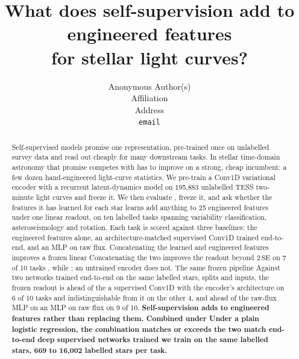 \documentclass{article}
\title{What does self-supervision add to engineered features\\for stellar light curves?}
\author{Anonymous Author(s)\\Affiliation\\Address\\\texttt{email}}
\providecommand{\DIFaddtex}[1]{{\protect\color{blue} \sf #1}} %
\providecommand{\DIFdeltex}[1]{{\protect\color{red} \scriptsize #1}} %
\providecommand{\DIFaddbegin}{} %
\providecommand{\DIFaddend}{} %
\providecommand{\DIFdelbegin}{} %
\providecommand{\DIFdelend}{} %
\providecommand{\DIFadd}[1]{\texorpdfstring{\DIFaddtex{#1}}{#1}} %
\providecommand{\DIFdel}[1]{\texorpdfstring{\DIFdeltex{#1}}{}} %
\providecommand{\DIFscaledelfig}{0.5}
\newlength{\DIFdelgraphicswidth} %
\newlength{\DIFdelgraphicsheight} %
\providecommand{\DIFaddincludegraphics}[2][]{{\color{blue}\fbox{\DIFOincludegraphics[#1]{#2}}}} %
\providecommand{\DIFdelincludegraphics}[2][]{%
\sbox{\DIFdelgraphicsbox}{\DIFOincludegraphics[#1]{#2}}%
\settoboxwidth{\DIFdelgraphicswidth}{\DIFdelgraphicsbox} %
\settoboxtotalheight{\DIFdelgraphicsheight}{\DIFdelgraphicsbox} %
\scalebox{\DIFscaledelfig}{%
\parbox[b]{\DIFdelgraphicswidth}{\usebox{\DIFdelgraphicsbox}\\[-\baselineskip] \rule{\DIFdelgraphicswidth}{0em}}\llap{\resizebox{\DIFdelgraphicswidth}{\DIFdelgraphicsheight}{%
\setlength{\unitlength}{\DIFdelgraphicswidth}%
\begin{picture}(1,1)%
\thicklines\linethickness{2pt} %
{\color[rgb]{1,0,0}\put(0,0){\framebox(1,1){}}}%
{\color[rgb]{1,0,0}\put(0,0){\line( 1,1){1}}}%
{\color[rgb]{1,0,0}\put(0,1){\line(1,-1){1}}}%
\end{picture}%
}\hspace*{3pt}}} %
} %
\DeclareRobustCommand{\DIFaddbegin}{\DIFOaddbegin \let\includegraphics\DIFaddincludegraphics} %
\DeclareRobustCommand{\DIFaddend}{\DIFOaddend \let\includegraphics\DIFOincludegraphics} %
\DeclareRobustCommand{\DIFdelbegin}{\DIFOdelbegin \let\includegraphics\DIFdelincludegraphics} %
\DeclareRobustCommand{\DIFdelend}{\DIFOaddend \let\includegraphics\DIFOincludegraphics} %
\begin{document}
\maketitle

\begin{abstract}
Self-supervised models promise one representation, pre-trained once on unlabelled survey data and
read out cheaply for many downstream tasks. In stellar time-domain astronomy that promise \DIFdelbegin \DIFdel{competes
with }\DIFdelend \DIFaddbegin \DIFadd{has to
improve on }\DIFaddend a strong, cheap incumbent: a few dozen \DIFdelbegin \DIFdel{hand-}\DIFdelend engineered light-curve statistics. We \DIFaddbegin \DIFadd{pre-}\DIFaddend train a
Conv1D variational encoder with a recurrent latent-dynamics model on 195{,}883 unlabelled TESS
two-minute light curves\DIFdelbegin \DIFdel{and freeze it. We then evaluate }\DIFdelend \DIFaddbegin \DIFadd{, freeze it, and ask whether }\DIFaddend the features it \DIFdelbegin \DIFdel{has learned for each star }\DIFdelend \DIFaddbegin \DIFadd{learns add anything to 25
engineered features under one linear readout, }\DIFaddend on ten labelled tasks spanning variability
classification, asteroseismology and rotation. \DIFdelbegin \DIFdel{Each task is
scored against three baselines: the engineered features alone, an architecture-matched supervised
Conv1D trained end-to-end, and an MLP on raw flux. Concatenating the learned and engineered features
improves a frozen linear }\DIFdelend \DIFaddbegin \DIFadd{Concatenating the two improves the }\DIFaddend readout beyond
$2\,\mathrm{SE}$ on 7 of 10 tasks\DIFdelbegin \DIFdel{, while }\DIFdelend \DIFaddbegin \DIFadd{; }\DIFaddend an untrained encoder does not. \DIFdelbegin \DIFdel{The
same frozen pipeline }\DIFdelend \DIFaddbegin \DIFadd{Against two networks trained
end-to-end on the same labelled stars, splits and inputs, the frozen readout }\DIFaddend is ahead of \DIFdelbegin \DIFdel{the }\DIFdelend \DIFaddbegin \DIFadd{a }\DIFaddend supervised
Conv1D \DIFaddbegin \DIFadd{with the encoder's architecture }\DIFaddend on 6 of 10 tasks and indistinguishable \DIFdelbegin \DIFdel{from it
}\DIFdelend on the other 4, and
ahead of \DIFdelbegin \DIFdel{the raw-flux MLP on }\DIFdelend \DIFaddbegin \DIFadd{an MLP on raw flux on }\DIFaddend 9 of 10. \textbf{Self-supervision adds to engineered features rather
than replacing them. \DIFdelbegin \DIFdel{Combined under }\DIFdelend \DIFaddbegin \DIFadd{Under }\DIFaddend a plain logistic regression, the \DIFaddbegin \DIFadd{combination matches or exceeds the }\DIFaddend two
\DIFdelbegin \DIFdel{match end-to-end deep }\DIFdelend \DIFaddbegin \DIFadd{supervised }\DIFaddend networks \DIFdelbegin \DIFdel{trained }\DIFdelend \DIFaddbegin \DIFadd{we train }\DIFaddend on the same \DIFdelbegin \DIFdel{labelled stars,
}\DIFdelend 669 to 16{,}002 \DIFaddbegin \DIFadd{labelled stars }\DIFaddend per task.}
\end{abstract}
\end{document}
